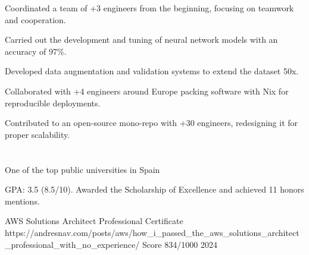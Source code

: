 \documentclass[]{cv}
\begin{document}
{}
\begin{tightemize}
	\item \dumblang%
	{Coordinated a team of +3 engineers from the beginning, focusing on teamwork and cooperation.}
	{}
	\item \dumblang%
	{Carried out the development and tuning of neural network models with an accuracy of 97\%.}
	{}
	\item \dumblang%
	{Developed data augmentation and validation systems to extend the dataset 50x.}
	{}
\end{tightemize}

\begin{tightemize}
	\item \dumblang%
	{Collaborated with +4 engineers around Europe packing software with Nix for reproducible deployments.}
	{}
	\item \dumblang%
	{Contributed to an open-source mono-repo with +30 engineers, redesigning it for proper scalability.}
	{}
\end{tightemize}



\section{}

{\dumblang%
	{One of the top public universities in Spain}
	{}}


\begin{tightemize}
	\item \dumblang%
	{GPA: 3.5 (8.5/10). Awarded the Scholarship of Excellence and achieved 11 honors mentions.}
	{}
\end{tightemize}

\runsubsection%
{\dumblang%
	{AWS Solutions Architect Professional Certificate}
	{}
}
{https://andresnav.com/posts/aws/how_i_passed_the_aws_solutions_architect_professional_with_no_experience/}
{Score 834/1000}
{2024}
\end{document}
